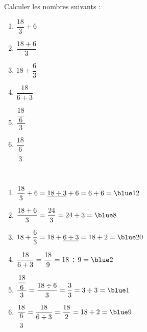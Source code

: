 \begin{exercice} %
   Calculer les nombres suivants :
   \begin{multicols}{3}
      \begin{enumerate}
         \item $\dfrac{18}{3}+6$
         \item $\dfrac{18+6}{3}$
         \columnbreak
         \item $18+\dfrac{6}{3}$
         \item $\dfrac{18}{6+3}$
         \columnbreak
         \item $\dfrac{\dfrac{18}{6}}{3}$
         \item $\dfrac{18}{\dfrac{6}{3}}$
      \end{enumerate}
   \end{multicols}
 \end{exercice}
 
 \begin{corrige}
    \ \\ [-5mm]
    \begin{enumerate}
       \item $\dfrac{18}{3}+6 =\underline{18\div3}+6 =6+6 =\blue 12$ \medskip
       \item $\dfrac{18+6}{3} =\dfrac{24}{3} =24\div3 =\blue 8$ \medskip
       \item $18+\dfrac{6}{3} =18+\underline{6\div3} =18+2 =\blue 20$ \medskip
       \item $\dfrac{18}{6+3} =\dfrac{18}{9} =18\div9 =\blue 2$ \medskip
       \item $\dfrac{\dfrac{18}{6}}{3} =\dfrac{18\div6}{3} =\dfrac{3}{3} =3\div3 =\blue 1$ \medskip
       \item $\dfrac{18}{\dfrac{6}{3}} =\dfrac{18}{6\div3} =\dfrac{18}{2} =18\div2 =\blue 9$
    \end{enumerate}
 \end{corrige}
